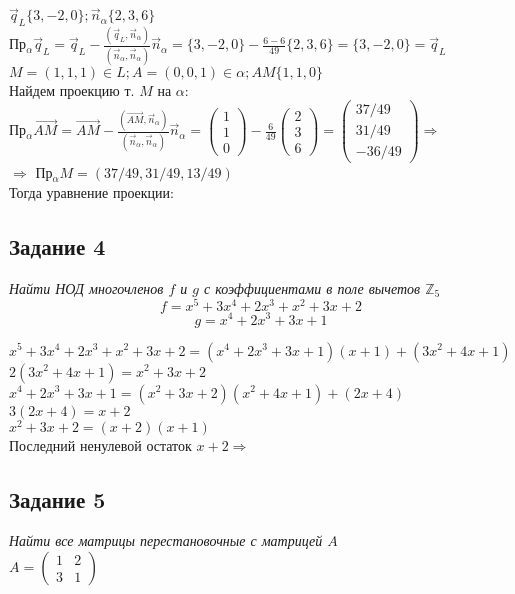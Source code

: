 \documentclass[a4paper]{article}
\theoremstyle{definition}
\theoremstyle{plain}
\begin{document}
$\vec{q}_{L}\{3, -2, 0\}; \vec{n}_{\alpha}\{2, 3, 6\}$\\
Пр$_{\alpha}\vec{q}_{L} = \vec{q}_{L} - \frac{(\vec{q}_{L}, \vec{n}_{\alpha})}{(\vec{n}_{\alpha}, \vec{n}_{\alpha})} \vec{n}_{\alpha} = %
\{3, -2, 0\} - \frac{6 - 6}{49}\{2, 3, 6\} = \{3, -2, 0\} = \vec{q}_{L}$\\
$M = (1, 1, 1) \in L; A = (0, 0, 1) \in \alpha; AM\{1, 1, 0\}$\\
Найдем проекцию т. $M$ на $\alpha$:\\
Пр$_{\alpha}\vec{AM} = \vec{AM} - \frac{(\vec{AM}, \vec{n}_{\alpha})}{(\vec{n}_{\alpha}, \vec{n}_{\alpha})}\vec{n}_{\alpha} = %
\begin{pmatrix}
  1\\ 1\\ 0
\end{pmatrix}
-
\frac{6}{49}
\begin{pmatrix}
  2\\ 3\\ 6
\end{pmatrix}
=
\begin{pmatrix}
  37/49\\ 31/49\\ -36/49
\end{pmatrix}
\Rightarrow$\\
$\Rightarrow$ Пр$_{\alpha}M = (37/49, 31/49, 13/49)$\\
Тогда уравнение проекции: 

\subsection*{Задание 4}

\emph{Найти \emph{НОД} многочленов $f$ и $g$ с коэффициентами в поле вычетов $\mathbb{Z}_{5}$}
\[
f = x^{5} + 3x^{4} + 2x^{3} + x^{2} + 3x + 2
\]
\[
g = x^{4} + 2x^{3} + 3x + 1
\]

\noindent $
x^{5} + 3x^{4} + 2x^{3} + x^{2} + 3x + 2
=
(x^{4} + 2x^{3} + 3x + 1)
(x + 1)
+
(3x^{2}+4x+1)
$\\
$
2(3x^{2}+4x+1) = x^{2}+3x+2
$\\
$
x^{4} + 2x^{3} + 3x + 1
=
(x^{2}+3x+2)
(x^{2}+4x+1)
+
(2x+4)
$\\
$
3(2x+4) = x+2
$\\
$
x^{2}+3x+2
=
(x + 2)
(x + 1)
$\\
Последний ненулевой остаток $x + 2 \Rightarrow$ 
\subsection*{Задание 5}
\emph{Найти все матрицы перестановочные с матрицей $A$}\\
$A =
\begin{pmatrix}
  1 & 2\\
  3 & 1
\end{pmatrix}$
\end{document}
